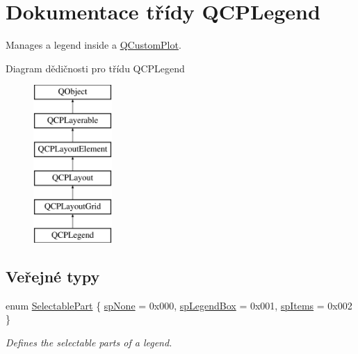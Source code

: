 \hypertarget{classQCPLegend}{}\section{Dokumentace třídy Q\+C\+P\+Legend}
\label{classQCPLegend}


Manages a legend inside a \hyperlink{classQCustomPlot}{Q\+Custom\+Plot}.  


Diagram dědičnosti pro třídu Q\+C\+P\+Legend\begin{figure}[H]
\begin{center}
\leavevmode
\includegraphics[height=6.000000cm]{classQCPLegend}
\end{center}
\end{figure}
\subsection*{Veřejné typy}
\begin{DoxyCompactItemize}
\item 
enum \hyperlink{classQCPLegend_a5404de8bc1e4a994ca4ae69e2c7072f1}{Selectable\+Part} \{ \hyperlink{classQCPLegend_a5404de8bc1e4a994ca4ae69e2c7072f1a378201c07d500af7126e3ec91652eed7}{sp\+None} = 0x000, 
\hyperlink{classQCPLegend_a5404de8bc1e4a994ca4ae69e2c7072f1a0fa4758962a46fa1dc9da818abae23c4}{sp\+Legend\+Box} = 0x001, 
\hyperlink{classQCPLegend_a5404de8bc1e4a994ca4ae69e2c7072f1a768bfb95f323db4c66473375032c0af7}{sp\+Items} = 0x002
 \}\begin{DoxyCompactList}\small\item\em Defines the selectable parts of a legend. \end{DoxyCompactList}
\end{DoxyCompactItemize}
